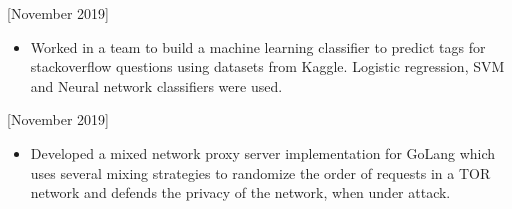 \documentclass{article}
\begin{document}
 [\normalfont{}November 2019]
\begin{itemize}
    \item Worked in a team to build a machine learning classifier to predict tags for stackoverflow questions using datasets from Kaggle. Logistic regression, SVM and Neural network classifiers were used.
\end{itemize} 

 [\normalfont{}November 2019]
\begin{itemize}
    \item Developed a mixed network proxy server implementation for GoLang which uses several mixing strategies to randomize the order of requests in a TOR network and defends the privacy of the network, when under attack.
\end{itemize} 
\end{document}
